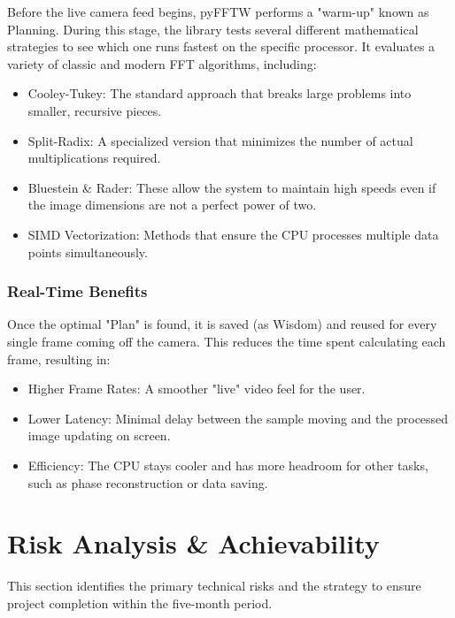 \documentclass[12pt,a4paper]{article}
\begin{document}
Before the live camera feed begins, pyFFTW performs a "warm-up" known as Planning. During this stage, the library tests several different mathematical strategies to see which one runs fastest on the specific processor. It evaluates a variety of classic and modern \ac{FFT} algorithms, including:

\begin{itemize}
    \item Cooley-Tukey: The standard approach that breaks large problems into smaller, recursive pieces.
    \item Split-Radix: A specialized version that minimizes the number of actual multiplications required.
    \item Bluestein \& Rader: These allow the system to maintain high speeds even if the image dimensions are not a perfect power of two.
    \item SIMD Vectorization: Methods that ensure the CPU processes multiple data points simultaneously.
\end{itemize}

\subsubsection*{Real-Time Benefits}

Once the optimal "Plan" is found, it is saved (as Wisdom) and reused for every single frame coming off the camera. This reduces the time spent calculating each frame, resulting in:

\begin{itemize}
    \item Higher Frame Rates: A smoother "live" video feel for the user.
    \item Lower Latency: Minimal delay between the sample moving and the processed image updating on screen.
    \item Efficiency: The CPU stays cooler and has more headroom for other tasks, such as phase reconstruction or data saving.
\end{itemize}\newpage

\section{Risk Analysis \& Achievability}

This section identifies the primary technical risks and the strategy to ensure project completion within the five-month period.
\end{document}
